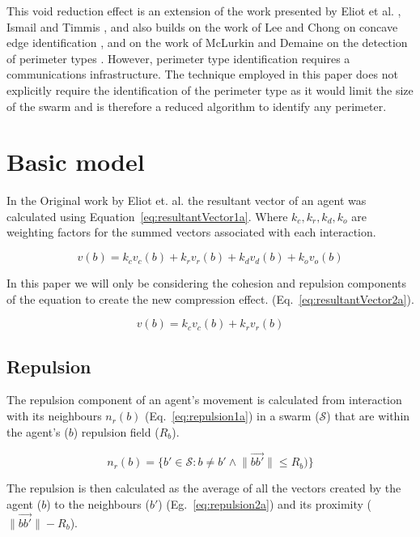 \documentclass[12pt,a4paper]{IEEEtran}
\begin{document}
This void reduction effect is an extension of the work presented by Eliot et al. \cite{eliot2019void}, Ismail and Timmis \cite{IT:10,TIBW:16}, and also builds on the work of Lee and Chong on concave edge identification \cite{GN:08}, and on the work of McLurkin and Demaine on the detection of perimeter types \cite{mclurkin2009}. However, perimeter type identification requires a communications infrastructure. The technique employed in this paper does not explicitly require the identification of the perimeter type as it would limit the size of the swarm\cite{eliot2019void,GN:08} and is therefore a reduced algorithm to identify any perimeter.

\section{Basic model}\label{basicModel}
In the Original work by Eliot et. al. the resultant vector of an agent was calculated using Equation~\ref{eq:resultantVector1a}. Where $k_c,k_r,k_d,k_o$ are weighting factors for the summed vectors associated with each interaction. 

\begin{equation}\label{eq:resultantVector1a}
	v(b) = k_cv_c(b) + k_rv_r(b) + k_dv_d(b) + k_ov_o(b)
\end{equation}

In this paper we will only be considering the cohesion and repulsion components of the equation to create the new compression effect. (Eq.~\ref{eq:resultantVector2a}).

\begin{equation}\label{eq:resultantVector2a}
v(b) = k_cv_c(b) + k_rv_r(b)
\end{equation}

\subsection{Repulsion}\label{repulsion:neighbours}
The repulsion component of an agent's movement is calculated from interaction with its neighbours $n_r(b)$ (Eq.~\ref{eq:repulsion1a}) in a swarm ($\mathcal{S}$) that are within the agent's ($b$) repulsion field ($R_b$).

\begin{equation}\label{eq:repulsion1a}
n_r(b) = \{b' \in \mathcal{S} : b \neq b' \land \lVert\vec{b b'}\rVert \leq R_b)\}
\end{equation}

The repulsion is then calculated as the average of all the vectors created by the agent ($b$) to the neighbours ($b'$) (Eg.~\ref{eq:repulsion2a}) and its proximity ($\lVert\vec{bb'}\rVert - R_b$).
\end{document}
